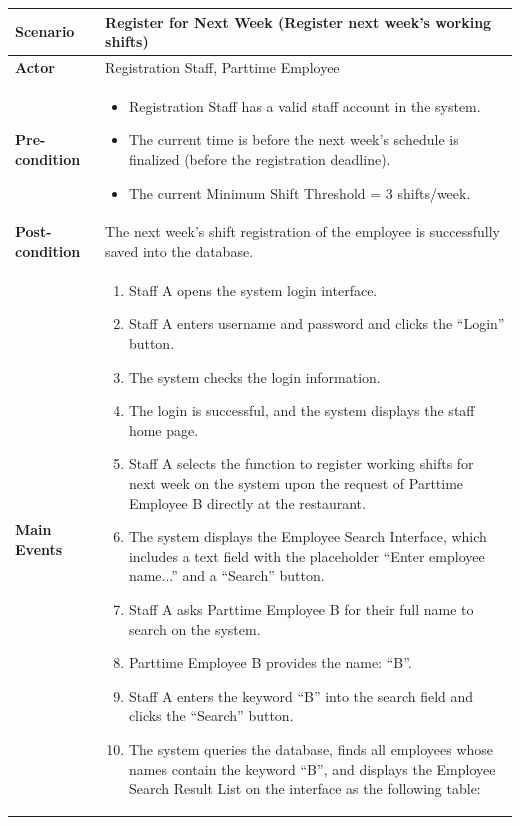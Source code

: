 \renewcommand{\arraystretch}{1.5}
\begin{longtable}{|p{3cm}|p{13cm}|}
\hline
\textbf{Scenario} & Register for Next Week (Register next week's working shifts) \\
\hline
\textbf{Actor} & Registration Staff, Parttime Employee \\
\hline
\textbf{Pre-condition} &
\begin{itemize}
    \item Registration Staff has a valid staff account in the system.
    \item The current time is before the next week's schedule is finalized (before the registration deadline).
    \item The current Minimum Shift Threshold = 3 shifts/week.
\end{itemize} \\
\hline
\textbf{Post-condition} & The next week's shift registration of the employee is successfully saved into the database. \\
\hline

\textbf{Main Events} &
\begin{enumerate}
    \item Staff A opens the system login interface.
    \item Staff A enters username and password and clicks the ``Login'' button.
    \item The system checks the login information.
    \item The login is successful, and the system displays the staff home page.
    \item Staff A selects the function to register working shifts for next week on the system upon the request of Parttime Employee B directly at the restaurant.
    \item The system displays the Employee Search Interface, which includes a text field with the placeholder ``Enter employee name...'' and a ``Search'' button.
    \item Staff A asks Parttime Employee B for their full name to search on the system.
    \item Parttime Employee B provides the name: ``B''.
    \item Staff A enters the keyword ``B'' into the search field and clicks the ``Search'' button.
    \item The system queries the database, finds all employees whose names contain the keyword ``B'', and displays the Employee Search Result List on the interface as the following table:


\end{enumerate}
\end{longtable}
